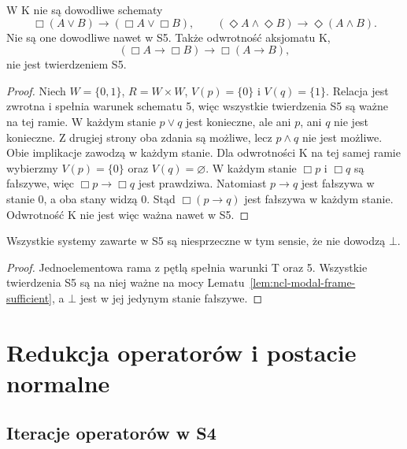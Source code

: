 \begin{stwierdzenie}
\label{prop:ncl-modal-nondistributivity}
W K nie są dowodliwe schematy
\[
 \Box(A\vee B)\to(\Box A\vee\Box B),
 \qquad
 (\Diamond A\wedge\Diamond B)\to\Diamond(A\wedge B).
\]
Nie są one dowodliwe nawet w S5.
Także odwrotność aksjomatu K,
\[
 (\Box A\to\Box B)\to\Box(A\to B),
\]
nie jest twierdzeniem S5.
\end{stwierdzenie}
\begin{proof}
Niech $W=\{0,1\}$, $R=W\times W$,
$V(p)=\{0\}$ i $V(q)=\{1\}$.
Relacja jest zwrotna i spełnia warunek
schematu 5, więc wszystkie twierdzenia S5
są ważne na tej ramie.
W każdym stanie $p\vee q$ jest konieczne,
ale ani $p$, ani $q$ nie jest konieczne.
Z drugiej strony oba zdania są możliwe,
lecz $p\wedge q$ nie jest możliwe.
Obie implikacje zawodzą w każdym stanie.
Dla odwrotności K na tej samej ramie wybierzmy
$V(p)=\{0\}$ oraz $V(q)=\varnothing$.
W każdym stanie $\Box p$ i $\Box q$ są fałszywe,
więc $\Box p\to\Box q$ jest prawdziwa.
Natomiast $p\to q$ jest fałszywa w stanie $0$,
a oba stany widzą $0$. Stąd $\Box(p\to q)$
jest fałszywa w każdym stanie.
Odwrotność K nie jest więc ważna nawet w S5.
\end{proof}

\begin{wniosek}
\label{cor:ncl-modal-basic-consistency}
Wszystkie systemy zawarte w S5 są niesprzeczne
w tym sensie, że nie dowodzą $\bot$.
\end{wniosek}
\begin{proof}
Jednoelementowa rama z pętlą spełnia warunki
T oraz 5. Wszystkie twierdzenia S5 są na niej
ważne na mocy Lematu~\ref{lem:ncl-modal-frame-sufficient},
a $\bot$ jest w jej jedynym stanie fałszywe.
\end{proof}

\section{Redukcja operatorów i postacie normalne}

\subsection{Iteracje operatorów w S4}

